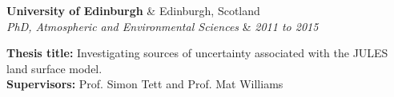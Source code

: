 \documentclass[11pt]{article}
\makeatletter
\newcommand{\superscript}[1]{\ensuremath{^{\textrm{#1}}}}
\newenvironment{newparagraph}{\par\setlength{\rightskip}{3cm}}
\newenvironment{resumeSubSectionHeader}{
    \par
    \begin{tabular*}{\textwidth}{l@{\extracolsep{\fill}}r}
    \par
} {
    \end{tabular*}
    \par
}
\newenvironment{resumeSubSectionBody}{
    \par
    \vspace{-0.8\parskip}
    \begin{small}
    \par
} {
    \par
    \end{small}
    \par
}
\makeatother
\begin{document}
%
%
\begin{resumeSubSectionHeader}

    \textbf{University of Edinburgh} & Edinburgh, Scotland \\
    \emph{PhD, Atmospheric and Environmental Sciences} & \emph{2011 to 2015} \\

\end{resumeSubSectionHeader}
\begin{resumeSubSectionBody}
		
   	\textbf{Thesis title:} Investigating sources of uncertainty associated with the JULES land surface model.\\
	\textbf{Supervisors:} Prof. Simon Tett and Prof. Mat Williams

		 
		 
        
            

\end{resumeSubSectionBody}
\end{document}
